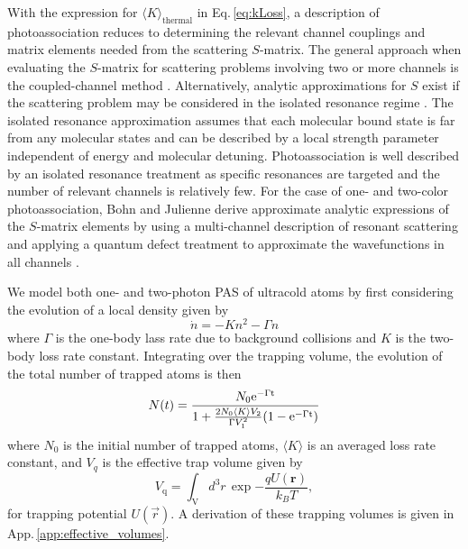 With the expression for $ \langle K \rangle_\text{thermal}$ in Eq.\,\ref{eq:kLoss}, a description of photoassociation reduces to determining the relevant channel couplings and matrix elements needed from the scattering $S$-matrix.
The general approach when evaluating the $S$-matrix for scattering problems involving two or more channels is the coupled-channel method \cite{Krems2009a}.
Alternatively, analytic approximations for $S$ exist if the scattering problem may be considered in the isolated resonance regime \cite{Bohn1999, Nicholson2015a}.
The isolated resonance approximation assumes that each molecular bound state is far from any molecular states and can be described by a local strength parameter independent of energy and molecular detuning.
Photoassociation is well described by an isolated resonance treatment as specific resonances are targeted and the number of relevant channels is relatively few.
For the case of one- and two-color photoassociation, Bohn and Julienne derive approximate analytic expressions of the $S$-matrix elements by using a multi-channel description of resonant scattering and applying a quantum defect treatment to approximate the wavefunctions in all channels \cite{Bohn1999, Bohn1996, Julienne2006}.

We model both one- and two-photon PAS of ultracold atoms by first considering the evolution of a local density given by
\begin{equation}
	\dot{n} = - K n^2 - \Gamma n
\end{equation}
where $\Gamma$ is the one-body lass rate due to background collisions and $K$ is the two-body loss rate constant.
Integrating over the trapping volume, the evolution of the total number of trapped atoms is then
\begin{equation}\label{eq:number}
   N(t)= \frac{N_0 \rm{e}^{-\Gamma t}}
   		{ 1 + \frac{2 N_0 \langle K \rangle V_2}{\Gamma V_1^2}(1-\rm{e}^{-\Gamma t}) }
\end{equation}
where $N_0$ is the initial number of trapped atoms, $\langle K \rangle$ is an averaged loss rate constant, and $V_q$ is the effective trap volume given by
\begin{equation}\label{eq:effectivevolumes}
	V_{\text{q}}=\int_{\mathrm{V}} d^3r \, \exp{-\frac{qU(\mathbf{r})}{k_{B}T}},
\end{equation}
for trapping potential $U(\vec{r})$.
A derivation of these trapping volumes is given in App.\,\ref{app:effective_volumes}.

